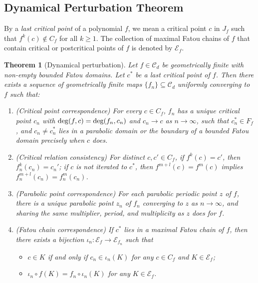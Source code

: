 \documentclass[a4paper,reqno,times, 11pt]{amsart}
\newtheorem{theorem}{Theorem}[section]
\theoremstyle{remark}
\theoremstyle{plain}
\numberwithin{equation}{section}
\def\EEE{{\cal E}}
\def\CCCC{\mathscr C}
\def\cal{\mathcal}
\begin{document}
	\subsection{Dynamical Perturbation Theorem}
	By a \emph{last critical point} of a polynomial $f$, we mean a critical point $c$ in $J_f$ such that $f^k(c)\notin C_f$ for all $k\geq 1$. The collection of maximal Fatou chains of $f$ that contain  critical or postcritical points of $f$ is denoted by $\EEE_f$.
	
	\begin{theorem}[Dynamical perturbation]\label{thm:perturbation}
		Let $f\in\CCCC_d$ be  geometrically finite with non-empty bounded Fatou domains. Let $c^*$ be a last critical point of $f$. Then there exists a sequence of geometrically finite maps $\{f_n\}\subseteq \CCCC_d$ uniformly converging to $f$ such that:
		\begin{enumerate}
			\item \textup{(Critical point correspondence)} For every $c\in C_f$,  $f_n$ has a unique critical point $c_n$ with  ${\rm deg}(f,c)={\rm deg}(f_n, c_n)$ and $c_n\to c$ as $n\to\infty$, such that $c_n^*\in F_f$, and  $c_n\not=c_n^*$ lies in a parabolic domain or the boundary of a bounded Fatou domain precisely when $c$ does.\vspace{3pt}
			
			\item \textup{(Critical relation consistency)} For distinct $c,c'\in C_f$, if $f^k(c)=c'$, then $f_n^k(c_n)=c_n'$;
			if $c$ is not iterated to $c^*$, then $f^{m+l}(c)=f^{m}(c)$ implies $f_n^{m+l}(c_{n})=f_n^m(c_{n})$. \vspace{3pt}
			\item\textup{(Parabolic point correspondence)} For each parabolic periodic point $z$ of $f$, there is a unique parabolic point $z_n$ of $f_n$ converging to $z$ as $n\to\infty$, and sharing the same multiplier, period, and multiplicity as $z$ does for $f$.			
			
			\item \textup{(Fatou chain correspondence)} If $c^*$ lies in a maximal Fatou chain of $f$, then there exists a bijection $\iota_n:\EEE_f\to\EEE_{f_n}$ such that\vspace{2pt}
			\begin{itemize}
				\item $c\in K$ if and only if $c_n\in\iota_n(K)$ for any $c\in C_f$ and $K\in\EEE_f$;
				\item $\iota_n\circ f(K)=f_n\circ \iota_n(K)$ for any $K\in\EEE_f$.
			\end{itemize}
			\vspace{3pt}
			

\end{enumerate}
\end{theorem}
\end{document}
